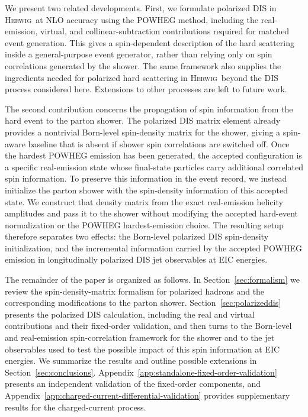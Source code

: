 \documentclass[a4paper,11pt]{article}
\newcommand{\Herwig}{\textsc{Herwig}}
\begin{document}
We present two related developments. First, we formulate polarized DIS in \Herwig\ at NLO accuracy using the POWHEG method, including the real-emission, virtual, and collinear-subtraction contributions required for matched event generation. This gives a spin-dependent description of the hard scattering inside a general-purpose event generator, rather than relying only on spin correlations generated by the shower. The same framework also supplies the ingredients needed for polarized hard scattering in \Herwig\ beyond the DIS process considered here. Extensions to other processes are left to future work.

The second contribution concerns the propagation of spin information from the hard event to the parton shower. The polarized DIS matrix element already provides a nontrivial Born-level spin-density matrix for the shower, giving a spin-aware baseline that is absent if shower spin correlations are switched off. Once the hardest POWHEG emission has been generated, the accepted configuration is a specific real-emission state whose final-state particles carry additional correlated spin information. To preserve this information in the event record, we instead initialize the parton shower with the spin-density information of this accepted state. We construct that density matrix from the exact real-emission helicity amplitudes and pass it to the shower without modifying the accepted hard-event normalization or the POWHEG hardest-emission choice. The resulting setup therefore separates two effects: the Born-level polarized DIS spin-density initialization, and the incremental information carried by the accepted POWHEG emission in longitudinally polarized DIS jet observables at EIC energies.

The remainder of the paper is organized as follows. In Section~\ref{sec:formalism} we review the spin-density-matrix formalism for polarized hadrons and the corresponding modifications to the parton shower. Section~\ref{sec:polarizeddis} presents the polarized DIS calculation, including the real and virtual contributions and their fixed-order validation, and then turns to the Born-level and real-emission spin-correlation framework for the shower and to the jet observables used to test the possible impact of this spin information at EIC energies. We summarize the results and outline possible extensions in Section~\ref{sec:conclusions}. Appendix~\ref{app:standalone-fixed-order-validation} presents an independent validation of the fixed-order components, and Appendix~\ref{app:charged-current-differential-validation} provides supplementary results for the charged-current process.
\end{document}
